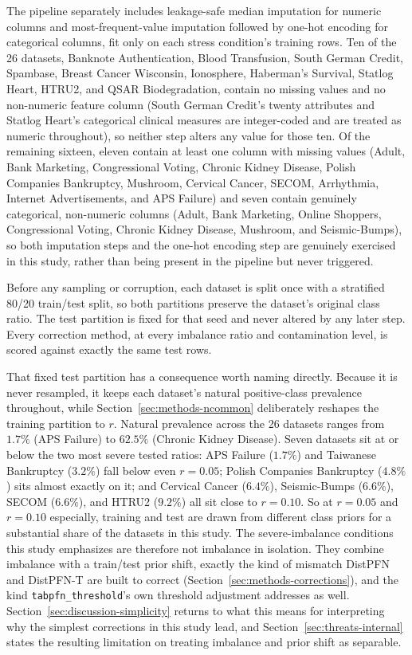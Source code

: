 The pipeline separately includes leakage-safe median imputation for numeric
columns and most-frequent-value imputation followed by one-hot encoding for
categorical columns, fit only on each stress condition's training rows.
Ten of the 26 datasets, Banknote Authentication, Blood Transfusion, South
German Credit, Spambase, Breast Cancer Wisconsin, Ionosphere, Haberman's
Survival, Statlog Heart, HTRU2, and QSAR Biodegradation, contain no missing
values and no non-numeric feature column (South German Credit's twenty
attributes and Statlog Heart's categorical clinical measures are
integer-coded and are treated as numeric throughout), so neither step
alters any value for those ten. Of the remaining sixteen, eleven contain at
least one column with missing values (Adult, Bank Marketing, Congressional
Voting, Chronic Kidney Disease, Polish Companies Bankruptcy, Mushroom,
Cervical Cancer, SECOM, Arrhythmia, Internet Advertisements, and APS
Failure) and seven contain genuinely categorical, non-numeric columns
(Adult, Bank Marketing, Online Shoppers, Congressional Voting, Chronic
Kidney Disease, Mushroom, and Seismic-Bumps), so both imputation steps and
the one-hot encoding step are genuinely exercised in this study, rather
than being present in the pipeline but never triggered.

Before any sampling or corruption, each dataset is split once with a
stratified 80/20 train/test split, so both partitions preserve the dataset's
original class ratio. The test partition is fixed for that seed and never
altered by any later step. Every correction method, at every imbalance ratio
and contamination level, is scored against exactly the same test rows.

That fixed test partition has a consequence worth naming directly. Because
it is never resampled, it keeps each dataset's natural positive-class
prevalence throughout, while Section~\ref{sec:methods-ncommon} deliberately reshapes
the training partition to $r$. Natural prevalence across the 26 datasets
ranges from $1.7\%$ (APS Failure) to $62.5\%$ (Chronic Kidney Disease).
Seven datasets sit at or below the two most severe tested ratios: APS
Failure ($1.7\%$) and Taiwanese Bankruptcy ($3.2\%$) fall below even
$r{=}0.05$; Polish Companies Bankruptcy ($4.8\%$) sits almost exactly on
it; and Cervical Cancer ($6.4\%$), Seismic-Bumps ($6.6\%$), SECOM
($6.6\%$), and HTRU2 ($9.2\%$) all sit close to $r{=}0.10$. So at
$r{=}0.05$ and $r{=}0.10$ especially, training and test are drawn from
different class priors for a substantial share of the datasets in this
study. The severe-imbalance conditions this study emphasizes are therefore
not imbalance in isolation. They combine
imbalance with a train/test prior shift, exactly the kind of mismatch
DistPFN and DistPFN-T are built to correct
(Section~\ref{sec:methods-corrections}), and the kind
\texttt{tabpfn\_threshold}'s own threshold adjustment addresses as well.
Section~\ref{sec:discussion-simplicity} returns to what this means for
interpreting why the simplest corrections in this study lead, and
Section~\ref{sec:threats-internal} states the resulting limitation on
treating imbalance and prior shift as separable.

